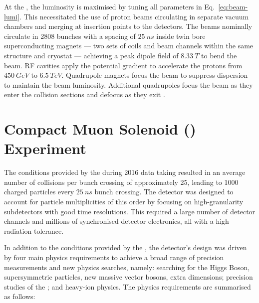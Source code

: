 At the \LHC, the luminosity is maximised by tuning all parameters in
Eq.~\eqref{eq:beam-lumi}. This necessitated the use of proton beams
circulating in separate vacuum chambers and merging at insertion points to the
detectors. The beams nominally circulate in 2808 bunches with a spacing of
${\SI{25}{ns}}$ inside twin bore superconducting magnets --- two sets of coils
and beam channels within the same structure and cryostat --- achieving a peak
dipole field of ${\SI{8.33}{T}}$ to bend the beam. RF cavities apply the
potential gradient to accelerate the protons from ${\SI{450}{GeV}}$ to
${\SI{6.5}{TeV}}$. Quadrupole magnets focus the beam to suppress dispersion to
maintain the beam luminosity. Additional quadrupoles focus the beam as they
enter the collision sections and defocus as they exit  \cite{Bruning:782076}.


\section{Compact Muon Solenoid (\CMS) Experiment}

The conditions provided by the \LHC during 2016 data taking resulted in an
average number of collisions per bunch crossing of approximately 25, leading
to 1000 charged particles every ${\SI{25}{ns}}$ bunch crossing. The \CMS
detector \cite{Bayatian:922757} was designed to account for particle
multiplicities of this order by focusing on high-granularity subdetectors with
good time resolutions. This required a large number of detector channels and
millions of synchronised detector electronics, all with a high radiation
tolerance.

In addition to the conditions provided by the \LHC, the \CMS detector's design
was driven by four main physics requirements to achieve a broad range of
precision measurements and new physics searches, namely: searching for the
Higgs Boson, supersymmetric particles, new massive vector bosons, extra
dimensions; precision studies of the \SM; and heavy-ion physics. The physics
requirements are summarised as follows:

